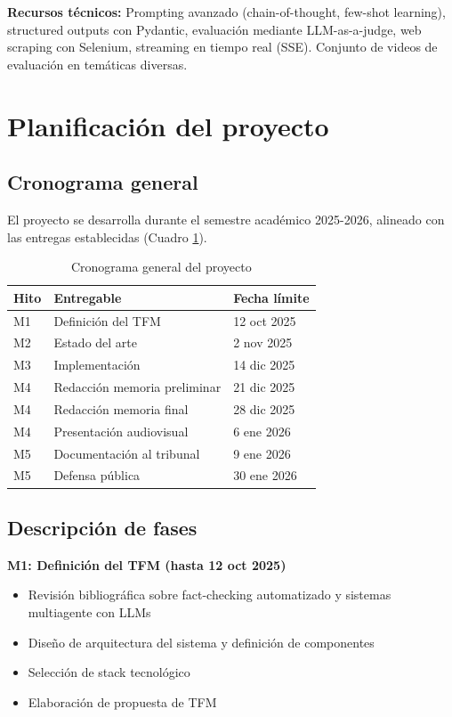\documentclass[12pt,a4paper]{article}
\begin{document}
\textbf{Recursos técnicos:} Prompting avanzado (chain-of-thought, few-shot learning), structured outputs con Pydantic, evaluación mediante LLM-as-a-judge, web scraping con Selenium, streaming en tiempo real (SSE). Conjunto de videos de evaluación en temáticas diversas.

\section{Planificación del proyecto}

\subsection{Cronograma general}

El proyecto se desarrolla durante el semestre académico 2025-2026, alineado con las entregas establecidas (Cuadro \ref{tab:cronograma}).

\begin{table}[h]
\centering
\begin{tabular}{|l|l|l|}
\hline
\textbf{Hito} & \textbf{Entregable} & \textbf{Fecha límite} \\
\hline
M1 & Definición del TFM & 12 oct 2025 \\
M2 & Estado del arte & 2 nov 2025\\
M3 & Implementación & 14 dic 2025\\
M4 & Redacción memoria preliminar & 21 dic 2025\\
M4 & Redacción memoria final & 28 dic 2025\\
M4 & Presentación audiovisual & 6 ene 2026\\
M5 & Documentación al tribunal & 9 ene 2026\\
M5 & Defensa pública & 30 ene 2026\\
\hline
\end{tabular}
\caption{Cronograma general del proyecto}
\label{tab:cronograma}
\end{table}

\subsection{Descripción de fases}

\textbf{M1: Definición del TFM (hasta 12 oct 2025)}
\begin{itemize}
    \item Revisión bibliográfica sobre fact-checking automatizado y sistemas multiagente con LLMs
    \item Diseño de arquitectura del sistema y definición de componentes
    \item Selección de stack tecnológico
    \item Elaboración de propuesta de TFM
\end{itemize}
\end{document}
